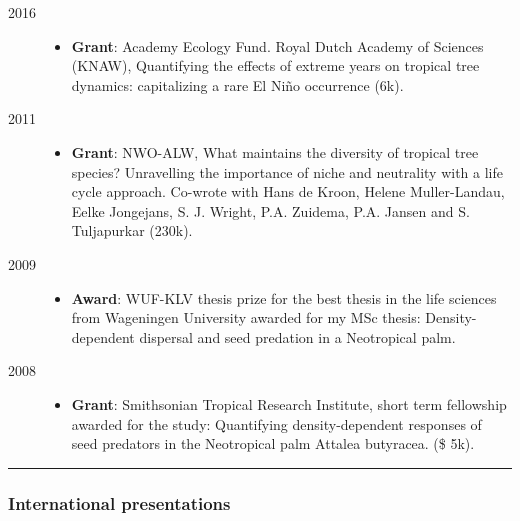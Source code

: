 \begin{description}
\item[2016]
\begin{itemize}
\tightlist
\item
  \textbf{Grant}: Academy Ecology Fund. Royal Dutch Academy of Sciences
  (KNAW), Quantifying the effects of extreme years on tropical tree
  dynamics: capitalizing a rare El Niño occurrence (6k).
\end{itemize}
\item[2011]
\begin{itemize}
\tightlist
\item
  \textbf{Grant}: NWO-ALW, What maintains the diversity of tropical tree
  species? Unravelling the importance of niche and neutrality with a
  life cycle approach. Co-wrote with Hans de Kroon, Helene
  Muller-Landau, Eelke Jongejans, S. J. Wright, P.A. Zuidema, P.A.
  Jansen and S. Tuljapurkar (230k).
\end{itemize}
\item[2009]
\begin{itemize}
\tightlist
\item
  \textbf{Award}: WUF-KLV thesis prize for the best thesis in the life
  sciences from Wageningen University awarded for my MSc thesis:
  Density-dependent dispersal and seed predation in a Neotropical palm.
\end{itemize}
\item[2008]
\begin{itemize}
\tightlist
\item
  \textbf{Grant}: Smithsonian Tropical Research Institute, short term
  fellowship awarded for the study: Quantifying density-dependent
  responses of seed predators in the Neotropical palm Attalea butyracea.
  (\$ 5k).
\end{itemize}
\end{description}

\begin{center}\rule{0.5\linewidth}{\linethickness}\end{center}

\subsubsection{International
presentations}\label{international-presentations}

